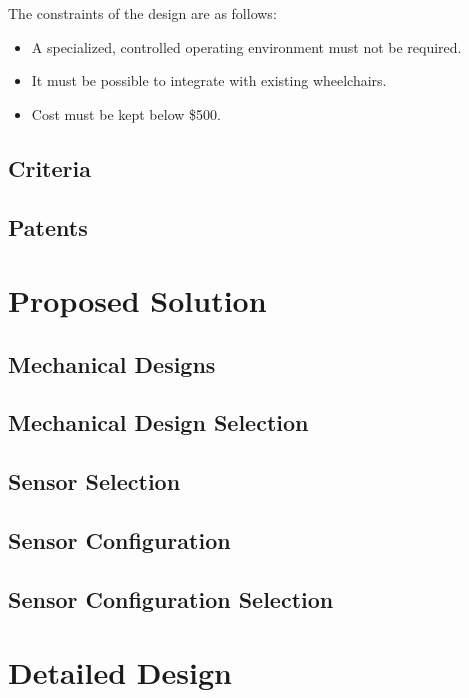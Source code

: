 \documentclass[oneside,final]{report}
\begin{document}
The constraints of the design are as follows:

\begin{itemize}
 \item A specialized, controlled operating environment must not be required. 
 \item It must be possible to integrate with existing wheelchairs. 
 \item Cost must be kept below \$500.
\end{itemize}

\section{Criteria}

\section{Patents}


\chapter{Proposed Solution}

\section{Mechanical Designs}

\section{Mechanical Design Selection}

\section{Sensor Selection}

\section{Sensor Configuration}

\section{Sensor Configuration Selection}


\chapter{Detailed Design}
\end{document}
